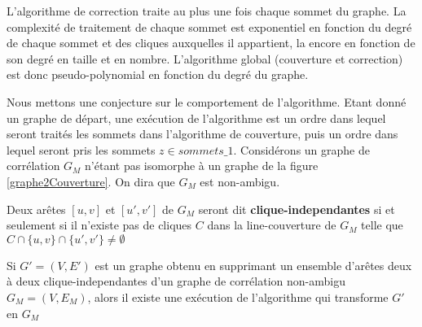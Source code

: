 L'algorithme de correction traite au plus une fois chaque sommet du graphe.
La complexit\'e de traitement de chaque sommet est exponentiel en fonction du degr\'e de chaque sommet et des cliques auxquelles il appartient, la encore en fonction  de son degr\'e en taille et en nombre.
L'algorithme global (couverture et correction) est donc pseudo-polynomial en fonction du degr\'e du graphe.
\newline

Nous mettons une conjecture sur le comportement de l'algorithme.
Etant donn\'e un graphe de d\'epart, une ex\'ecution de l'algorithme est un ordre dans lequel seront trait\'es les sommets dans l'algorithme de couverture, puis un ordre dans lequel seront pris les sommets $z \in sommets\_1$.
\newline
Consid\'erons un graphe de corr\'elation $G_M$ n'\'etant pas isomorphe \`a un graphe de la figure \ref{graphe2Couverture}. On dira que $G_M$ est non-ambigu.

Deux ar\^etes $[u,v]$ et $[u',v']$ de $G_M$ seront dit {\bf clique-independantes} si et seulement si il n'existe pas de cliques $C$ dans la line-couverture  de $G_M$ telle que 
$C \cap \{u,v\} \cap \{u',v'\} \ne \emptyset$

\begin{conjecture}
Si $G'=(V, E')$ est un graphe obtenu en supprimant un ensemble d'ar\^etes deux \`a deux clique-independantes d'un graphe de corr\'elation non-ambigu $G_M=(V,E_M)$, alors il existe une ex\'ecution de l'algorithme qui transforme $G'$ en $G_M$
\end{conjecture}
